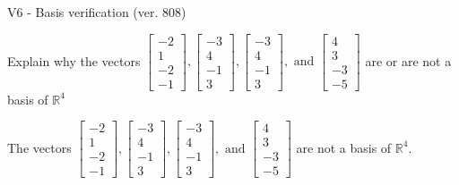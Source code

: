 \begin{exercise}
  \begin{exerciseTitle}V6 - Basis verification (ver. 808)\end{exerciseTitle}
  \begin{exerciseStatement}
    Explain why the vectors \(\left[\begin{array}{r}
-2 \\
1 \\
-2 \\
-1
\end{array}\right] , \left[\begin{array}{r}
-3 \\
4 \\
-1 \\
3
\end{array}\right] , \left[\begin{array}{r}
-3 \\
4 \\
-1 \\
3
\end{array}\right] , \text{ and } \left[\begin{array}{r}
4 \\
3 \\
-3 \\
-5
\end{array}\right]\) are or are not a basis of \(\mathbb{R}^4\)	


  \end{exerciseStatement}
  \begin{exerciseAnswer}
   The vectors \(\left[\begin{array}{r}
-2 \\
1 \\
-2 \\
-1
\end{array}\right] , \left[\begin{array}{r}
-3 \\
4 \\
-1 \\
3
\end{array}\right] , \left[\begin{array}{r}
-3 \\
4 \\
-1 \\
3
\end{array}\right] , \text{ and } \left[\begin{array}{r}
4 \\
3 \\
-3 \\
-5
\end{array}\right]\) 
  	 are not  a basis of \(\mathbb{R}^4\).
  


  \end{exerciseAnswer}
\end{exercise}